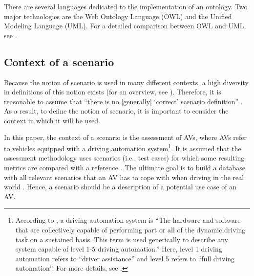 There are several languages dedicated to the implementation of an ontology. Two major technologies are the Web Ontology Language (OWL) and the Unified Modeling Language (UML). 
For a detailed comparison between OWL and UML, see \cite{kiko2005detailed}.



\subsection{Context of a scenario}
\label{sec:context}

Because the notion of scenario is used in many different contexts, a high diversity in definitions of this notion exists (for an overview, see \cite{vannotten2003updated, bishop2007scentechniques}). Therefore, it is reasonable to assume that ``there is no [generally] `correct' scenario definition'' \cite{vannotten2003updated}. As a result, to define the notion of scenario, it is important to consider the context in which it will be used. 

In this paper, the context of a scenario is the assessment of AVs, where AVs refer to vehicles equipped with a driving automation system\footnote{According to \cite{sae2018j3016}, a driving automation system is ``The hardware and software that are collectively capable of performing part or all of the dynamic driving task on a sustained basis. This term is used generically to describe any system capable of level 1-5 driving automation.'' Here, level 1 driving automation refers to ``driver assistance'' and level 5 refers to ``full driving automation''. For more details, see \cite{sae2018j3016}.}. 
It is assumed that the assessment methodology uses scenarios (i.e., test cases) for which some resulting metrics are compared with a reference \cite{stellet2015taxonomy}. 
The ultimate goal is to build a database with all relevant scenarios that an AV has to cope with when driving in the real world \cite{putz2017pegasus}. Hence, a scenario should be a description of a potential use case of an AV. 

